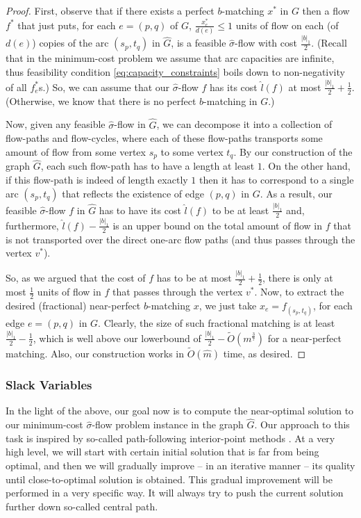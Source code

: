 \documentclass[11pt, letterpaper]{article}
\newcommand{\onorm}[1]{|#1|_{1}}
\newcommand{\tO}[1]{\widetilde{O}(#1)}
\newcommand{\cG}{{G}}
\newcommand{\hG}{\widehat{G}}
\newcommand{\hm}{\widehat{m}}
\newcommand{\hl}{\hat{l}}
\newcommand{\hvsigma}{\boldsymbol{\mathit{\hat{\sigma}}}}
\newcommand{\bb}{\boldsymbol{\mathit{b}}}
\newcommand{\ff}{\boldsymbol{\mathit{f}}}
\newcommand{\xx}{\boldsymbol{\mathit{x}}}
\begin{document}
\begin{proof}
First, observe that if there exists a perfect $\bb$-matching $\xx^*$ in $\cG$ then a flow $\ff^*$ that just puts, for each $e=(p,q)$ of $\cG$, $\frac{x^*_e}{d(e)}\leq 1$ units of flow on each (of $d(e)$) copies of the arc $(s_p,t_q)$ in $\hG$, is a feasible $\hvsigma$-flow with cost $\frac{\onorm{\bb}}{2}$. (Recall that in the minimum-cost problem we assume that arc capacities are infinite, thus feasibility condition \eqref{eq:capacity_constraints} boils down to non-negativity of all $f_e^*$s.) So, we can assume that our $\hvsigma$-flow $\ff$ has its cost $\hl(\ff)$ at most $\frac{\onorm{\bb}}{2}+\frac{1}{2}$. (Otherwise, we know that there is no perfect $\bb$-matching in $\cG$.)

Now, given any feasible $\hvsigma$-flow in $\hG$, we can decompose it into a collection of flow-paths and flow-cycles, where each of these flow-paths transports some amount of flow from some vertex $s_p$ to some vertex $t_q$. By our construction of the graph $\hG$, each such flow-path has to have a length at least $1$. On the other hand, if this flow-path is indeed of length exactly $1$ then it has to correspond to a single arc $(s_p,t_q)$ that reflects the existence of edge $(p,q)$ in $\cG$. As a result, our feasible $\hvsigma$-flow $\ff$ in $\hG$ has to have its cost $\hl(\ff)$ to be at least $\frac{\onorm{\bb}}{2}$ and, furthermore, $\hl(\ff)-\frac{\onorm{\bb}}{2}$ is an upper bound on the total amount of flow in $\ff$ that is not transported over the direct one-arc flow paths (and thus passes through the vertex $v^*$).  

So, as we argued that the cost of $\ff$ has to be at most $\frac{\onorm{\bb}}{2}+\frac{1}{2}$, there is only at most $\frac{1}{2}$ units of flow in $\ff$ that passes through the vertex $v^*$. Now, to extract the desired (fractional) near-perfect $\bb$-matching $\xx$, we just take $x_e=f_{(s_p,t_q)}$, for each edge $e=(p,q)$ in $\cG$. Clearly, the size of such fractional matching is at least $\frac{\onorm{\bb}}{2}-\frac{1}{2}$, which is well above our lowerbound of $\frac{\onorm{\bb}}{2}-\tO{m^{\frac{3}{7}}}$ for a near-perfect matching. Also, our construction works in $\tO{\hm}$ time, as desired. 
\end{proof}

\subsubsection*{Slack Variables}

In the light of the above, our goal now is to compute the near-optimal solution to our minimum-cost $\hvsigma$-flow problem instance in the graph $\hG$. Our approach to this task is inspired by so-called path-following interior-point methods \cite{Ye97,Wright97,BoydV04}. At a very high level, we will start with certain initial solution that is far from being optimal, and then we will gradually improve -- in an iterative manner -- its quality until close-to-optimal solution is obtained. This gradual improvement will be performed in a very specific way. It will always try to push the current solution further down so-called central path. 
\end{document}
